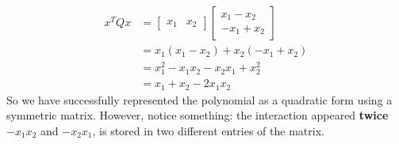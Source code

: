 \begin{examplebox}
\begin{enumerate}
        \begin{equation*}
            \begin{aligned}
                x^T Q x &= \begin{bmatrix} x_1 & x_2 \end{bmatrix} \begin{bmatrix} x_1 - x_2 \\ -x_1 + x_2 \end{bmatrix} \\
                &= x_1\left(x_1 - x_2\right) + x_2\left(-x_1 + x_2\right) \\
                &= x_1^2 - x_1 x_2 - x_2 x_1 + x_2^2 \\
                &= x_1 + x_2 - 2x_1 x_2
            \end{aligned}
        \end{equation*}
        So we have successfully represented the polynomial as a quadratic form using a symmetric matrix. However, notice something: the interaction appeared \textbf{twice} $-x_1 x_2$ and $-x_2 x_1$, is stored in two different entries of the matrix.



\end{enumerate}
\end{examplebox}
